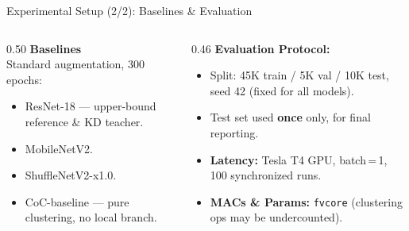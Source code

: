 \documentclass{beamer}
\begin{document}
\begin{frame}{Experimental Setup (2/2): Baselines \& Evaluation}
  \begin{columns}[T]
    \begin{column}{0.50\textwidth}
      \textbf{Baselines}\\
      {\small Standard augmentation, 300 epochs:}
      \begin{itemize}\setlength\itemsep{6pt}
        \item ResNet-18 --- upper-bound reference
              \& KD teacher.
        \item MobileNetV2.
        \item ShuffleNetV2-x1.0.
        \item CoC-baseline --- pure clustering,
              no local branch.
      \end{itemize}
    \end{column}
    \begin{column}{0.46\textwidth}
      \textbf{Evaluation Protocol:}
      \begin{itemize}\setlength\itemsep{6pt}
        \item Split: 45K train / 5K val / 10K test,
              seed 42 (fixed for all models).
        \item Test set used \textbf{once} only,
              for final reporting.
        \item \textbf{Latency:} Tesla T4 GPU,
              batch\,=\,1, 100 synchronized runs.
        \item \textbf{MACs \& Params:} \texttt{fvcore}
              (clustering ops may be undercounted).
      \end{itemize}
    \end{column}
  \end{columns}
\end{frame}
\end{document}
